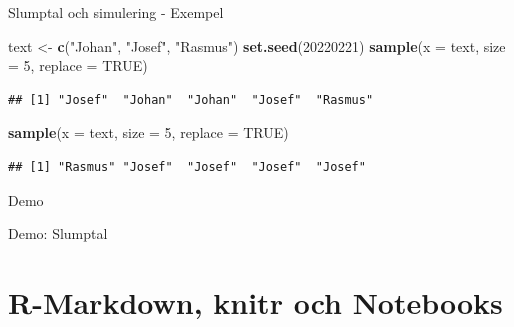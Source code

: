 \documentclass[
  11pt,
  ignorenonframetext,
  handout]{beamer}
\newenvironment{Shaded}{\begin{snugshade}}{\end{snugshade}}
\newcommand{\AttributeTok}[1]{\textcolor[rgb]{0.13,0.29,0.53}{#1}}
\newcommand{\ConstantTok}[1]{\textcolor[rgb]{0.56,0.35,0.01}{#1}}
\newcommand{\DecValTok}[1]{\textcolor[rgb]{0.00,0.00,0.81}{#1}}
\newcommand{\FunctionTok}[1]{\textcolor[rgb]{0.13,0.29,0.53}{\textbf{#1}}}
\newcommand{\NormalTok}[1]{#1}
\newcommand{\OtherTok}[1]{\textcolor[rgb]{0.56,0.35,0.01}{#1}}
\newcommand{\StringTok}[1]{\textcolor[rgb]{0.31,0.60,0.02}{#1}}
\begin{document}
\begin{frame}[fragile]{Slumptal och simulering - Exempel}
\protect{}\label{slumptal-och-simulering---exempel-1}
\begin{Shaded}
\begin{Highlighting}[]
\NormalTok{text }\OtherTok{\textless{}{-}} \FunctionTok{c}\NormalTok{(}\StringTok{"Johan"}\NormalTok{, }\StringTok{"Josef"}\NormalTok{, }\StringTok{"Rasmus"}\NormalTok{)}
\FunctionTok{set.seed}\NormalTok{(}\DecValTok{20220221}\NormalTok{)}
\FunctionTok{sample}\NormalTok{(}\AttributeTok{x =}\NormalTok{ text, }\AttributeTok{size =} \DecValTok{5}\NormalTok{, }\AttributeTok{replace =} \ConstantTok{TRUE}\NormalTok{)}
\end{Highlighting}
\end{Shaded}

\pause

\begin{verbatim}
## [1] "Josef"  "Johan"  "Johan"  "Josef"  "Rasmus"
\end{verbatim}

\pause

\begin{Shaded}
\begin{Highlighting}[]
\FunctionTok{sample}\NormalTok{(}\AttributeTok{x =}\NormalTok{ text, }\AttributeTok{size =} \DecValTok{5}\NormalTok{, }\AttributeTok{replace =} \ConstantTok{TRUE}\NormalTok{)}
\end{Highlighting}
\end{Shaded}

\pause

\begin{verbatim}
## [1] "Rasmus" "Josef"  "Josef"  "Josef"  "Josef"
\end{verbatim}
\end{frame}

\begin{frame}{Demo}
\protect{}\label{demo-1}
\begin{block}{Demo: Slumptal}
\protect{}\label{demo-slumptal}
\end{block}
\end{frame}

\section{R-Markdown, knitr och
Notebooks}\label{r-markdown-knitr-och-notebooks}
\end{document}
